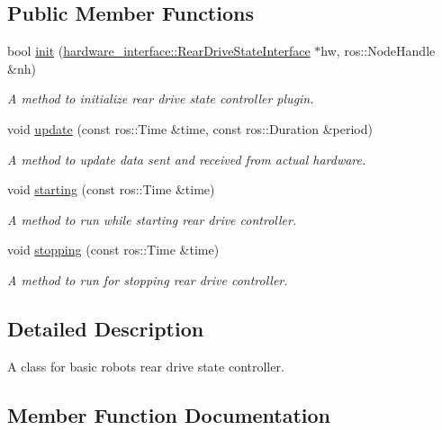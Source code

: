\subsection*{Public Member Functions}
\begin{DoxyCompactItemize}
\item 
bool \hyperlink{classrear__drive__state__controller_1_1RearDriveStateController_a4cade2fa3f7bf52491431548ad6a3d97}{init} (\hyperlink{classhardware__interface_1_1RearDriveStateInterface}{hardware\+\_\+interface\+::\+Rear\+Drive\+State\+Interface} $\ast$hw, ros\+::\+Node\+Handle \&nh)
\begin{DoxyCompactList}\small\item\em A method to initialize rear drive state controller plugin. \end{DoxyCompactList}\item 
void \hyperlink{classrear__drive__state__controller_1_1RearDriveStateController_a5eee03357f95a146b72947ce5f277a41}{update} (const ros\+::\+Time \&time, const ros\+::\+Duration \&period)
\begin{DoxyCompactList}\small\item\em A method to update data sent and received from actual hardware. \end{DoxyCompactList}\item 
void \hyperlink{classrear__drive__state__controller_1_1RearDriveStateController_a53a87a7512f06f14c71a0bda39a7d37d}{starting} (const ros\+::\+Time \&time)
\begin{DoxyCompactList}\small\item\em A method to run while starting rear drive controller. \end{DoxyCompactList}\item 
void \hyperlink{classrear__drive__state__controller_1_1RearDriveStateController_af2618c5f4cadfde5a696aa6ad2ce6714}{stopping} (const ros\+::\+Time \&time)
\begin{DoxyCompactList}\small\item\em A method to run for stopping rear drive controller. \end{DoxyCompactList}\end{DoxyCompactItemize}


\subsection{Detailed Description}
A class for basic robot\textquotesingle{}s rear drive state controller. 

\subsection{Member Function Documentation}
\mbox{\label{classrear__drive__state__controller_1_1RearDriveStateController_a4cade2fa3f7bf52491431548ad6a3d97}} 
